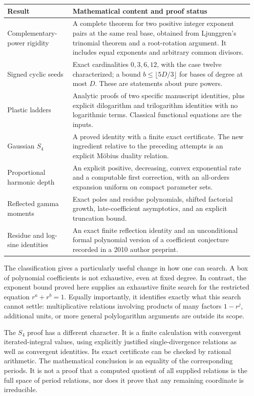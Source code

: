 \begin{longtable}{@{}>{\raggedright\arraybackslash}p{}>{\raggedright\arraybackslash}p{}@{}}
\toprule
Result & Mathematical content and proof status\\
\midrule\endhead
Complementary-power rigidity & A complete theorem for two positive
integer exponent pairs at the same real base, obtained from Ljunggren's
trinomial theorem and a root-rotation argument. It includes equal
exponents and arbitrary common divisors.\\[3pt]
Signed cyclic seeds & Exact cardinalities $0,3,6,12$, with the case
twelve characterized; a bound $b\leq\lfloor5D/3\rfloor$ for bases of
degree at most $D$. These are statements about pure powers.\\[3pt]
Plastic ladders & Analytic proofs of two specific manuscript identities,
plus explicit dilogarithm and trilogarithm identities with no
logarithmic terms. Classical functional equations are the inputs.\\[3pt]
Gaussian $S_4$ & A proved identity with a finite exact certificate.
The new ingredient relative to the preceding attempts is an explicit
M\"obius duality relation.\\[3pt]
Proportional harmonic depth & An explicit positive, decreasing, convex
exponential rate and a computable first correction, with an all-orders
expansion uniform on compact parameter sets.\\[3pt]
Reflected gamma moments & Exact poles and residue polynomials, shifted
factorial growth, late-coefficient asymptotics, and an explicit
truncation bound.\\[3pt]
Residue and log-sine identities & An exact finite reflection identity
and an unconditional formal polynomial version of a coefficient
conjecture recorded in a 2010 author preprint.\\
\bottomrule
\end{longtable}

The classification gives a particularly useful change in how one can
search. A box of polynomial coefficients is not exhaustive, even at
fixed degree. In contrast, the exponent bound proved here supplies an
exhaustive finite search for the restricted equation $r^a+r^b=1$.
Equally importantly, it identifies exactly what this search cannot
settle: multiplicative relations involving products of many factors
$1-r^j$, additional units, or more general polylogarithm arguments are
outside its scope.

The $S_4$ proof has a different character. It is a finite calculation
with convergent iterated-integral values, using explicitly justified
single-divergence relations as well as convergent identities. Its exact certificate can be checked by
rational arithmetic. The mathematical conclusion is an equality of
the corresponding periods. It is not a proof that a computed quotient
of all supplied relations is the full space of period relations, nor
does it prove that any remaining coordinate is irreducible.

